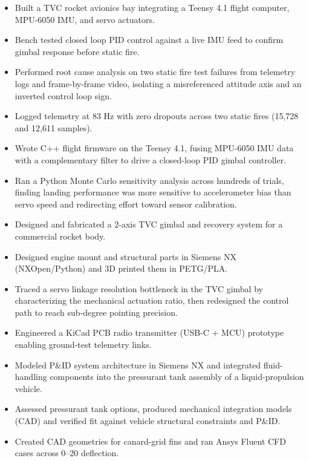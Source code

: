 \begin{itemize}
  \item Built a TVC rocket avionics bay integrating a Teensy 4.1 flight computer, MPU-6050 IMU, and servo actuators.
  \item Bench tested closed loop PID control against a live IMU feed to confirm gimbal response before static fire.
  \item Performed root cause analysis on two static fire test failures from telemetry logs and frame-by-frame video, isolating a misreferenced attitude axis and an inverted control loop sign.
  \item Logged telemetry at 83 Hz with zero dropouts across two static fires (15,728 and 12,611 samples).
  \item Wrote C++ flight firmware on the Teensy 4.1, fusing MPU-6050 IMU data with a complementary filter to drive a closed-loop PID gimbal controller.
  \item Ran a Python Monte Carlo sensitivity analysis across hundreds of trials, finding landing performance was more sensitive to accelerometer bias than servo speed and redirecting effort toward sensor calibration.
  \item Designed and fabricated a 2-axis TVC gimbal and recovery system for a commercial rocket body.
  \item Designed engine mount and structural parts in Siemens NX (NXOpen/Python) and 3D printed them in PETG/PLA.
  \item Traced a servo linkage resolution bottleneck in the TVC gimbal by characterizing the mechanical actuation ratio, then redesigned the control path to reach sub-degree pointing precision.
\end{itemize}
\entrygap

\begin{itemize}
  \item Engineered a KiCad PCB radio transmitter (USB-C + MCU) prototype enabling ground-test telemetry links.
  \item Modeled P\&ID system architecture in Siemens NX and integrated fluid-handling components into the pressurant tank assembly of a liquid-propulsion vehicle.
  \item Assessed pressurant tank options, produced mechanical integration models (CAD) and verified fit against vehicle structural constraints and P\&ID.
  \item Created CAD geometries for canard-grid fins and ran Ansys Fluent CFD cases across 0--20\textdegree{} deflection.
\end{itemize}
\entrygap

